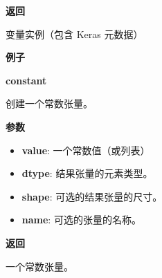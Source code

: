 \textbf{返回}

变量实例（包含 Keras 元数据）

\textbf{例子}

\begin{Shaded}
\begin{Highlighting}[]
\OperatorTok{>>>}    
\OperatorTok{>>>} \OperatorTok{=} \NormalTok{np.array([[}\NormalTok{, }\NormalTok{], [}\NormalTok{, }\NormalTok{]])}
\OperatorTok{>>>} \OperatorTok{=} \OperatorTok{=}\OperatorTok{=}\OperatorTok{=}\NormalTok{)}
\OperatorTok{>>>} 
\OperatorTok{>>>} 
\OperatorTok{>>>} 
\NormalTok{array([[ }\NormalTok{.],}
       \NormalTok{[ }\NormalTok{.]])}
\end{Highlighting}
\end{Shaded}


\textbf{constant}\label{constant}

\begin{Shaded}
\begin{Highlighting}[]
\OperatorTok{=}\OperatorTok{=}\OperatorTok{=}\NormalTok{)}
\end{Highlighting}
\end{Shaded}

创建一个常数张量。

\textbf{参数}

\begin{itemize}
\tightlist
\item
  \textbf{value}: 一个常数值（或列表）
\item
  \textbf{dtype}: 结果张量的元素类型。
\item
  \textbf{shape}: 可选的结果张量的尺寸。
\item
  \textbf{name}: 可选的张量的名称。
\end{itemize}

\textbf{返回}

一个常数张量。


